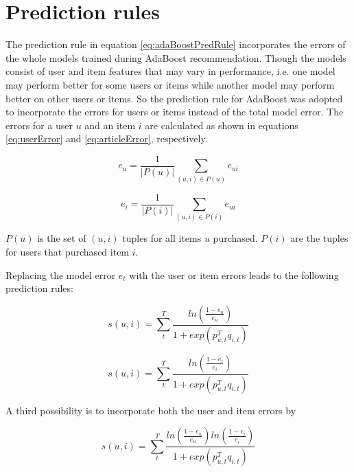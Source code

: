 \documentclass[10pt]{reportMaster}
\begin{document}
\section{Prediction rules}
\label{sec:predictionRules}

The prediction rule in equation \ref{eq:adaBoostPredRule} incorporates the errors of the whole models trained during AdaBoost recommendation.
Though the models consist of user and item features that may vary in performance, i.e. one model may perform better for some users or items while another model may perform better on other users or items.
So the prediction rule for AdaBoost was adopted to incorporate the errors for users or items instead of the total model error.
The errors for a user $u$ and an item $i$ are calculated as shown in equations \ref{eq:userError} and \ref{eq:articleError}, respectively.

\begin{equation}
	\label{eq:userError}
	e_{u} = \frac{1}{|P(u)|} \sum_{(u,i) \in P(u)}{e_{ui}}
\end{equation}

\begin{equation}
	\label{eq:articleError}
	e_{i} = \frac{1}{|P(i)|} \sum_{(u,i) \in P(i)}{e_{ui}}
\end{equation}

$P(u)$ is the set of $(u,i)$ tuples for all items $u$ purchased.
$P(i)$ are the tuples for users that purchased item $i$.

Replacing the model error $e_t$ with the user or item errors leads to the following prediction rules:

\begin{equation}
\label{eq:userErrorPrediction}
	s(u,i) = \sum_t^T{\frac{ln(\frac{1 - e_u}{e_u})}{1 + exp(p_{u,t}^Tq_{i,t})}}
\end{equation}

\begin{equation}
\label{eq:articleErrorPrediction}
s(u,i) = \sum_t^T{\frac{ln(\frac{1 - e_i}{e_i})}{1 + exp(p_{u,t}^Tq_{i,t})}}
\end{equation}

A third possibility is to incorporate both the user and item errors by 

\begin{equation}
\label{eq:combinedErrorPrediction}
s(u,i) = \sum_t^T{\frac{ln(\frac{1 - e_u}{e_u})ln(\frac{1 - e_i}{e_i})}{1 + exp(p_{u,t}^Tq_{i,t})}}
\end{equation}
\end{document}
